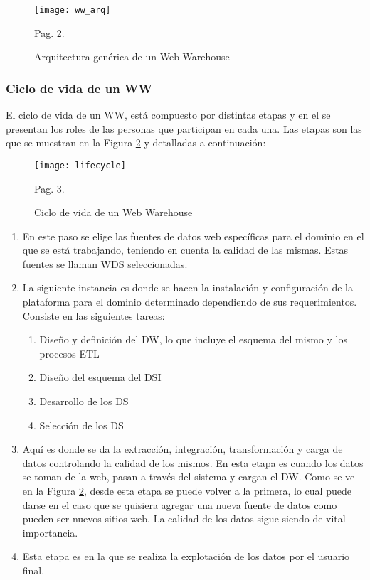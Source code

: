 \documentclass[a4paper,11pt]{article}
\begin{document}
\begin{flushleft}
    \begin{figure}[!htb]
      \begin{center}
        \texttt{[image: ww\_arq]}
        \caption{Arquitectura genérica de un Web Warehouse} \cite{webwarehouse} Pag. 2.
        \label{ww_arq}
      \end{center}
    \end{figure}
    
    
    \subsubsection{Ciclo de vida de un WW}
    
    El ciclo de vida de un WW, está compuesto por distintas etapas y en el se presentan los roles de las personas que participan en cada una. Las
    etapas son las que se muestran en la Figura \ref{lifecycle} y detalladas a continuación:
    
    \begin{figure}[!htb]
      \begin{center}
        \texttt{[image: lifecycle]}
        \caption{Ciclo de vida de un Web Warehouse} \cite{webwarehouse} Pag. 3.
        \label{lifecycle}
      \end{center}
    \end{figure}
    
    \begin{enumerate}
      \item En este paso se elige las fuentes de datos web específicas para el dominio en el que se está trabajando, teniendo en cuenta la calidad de las mismas.
      Estas fuentes se llaman WDS seleccionadas.
      \item La siguiente instancia es donde se hacen la instalación y configuración de la plataforma para el dominio determinado dependiendo de sus
      requerimientos. Consiste en las siguientes tareas:
        \begin{enumerate}
          \item Diseño y definición del DW, lo que incluye el esquema del mismo y los procesos ETL
          \item Diseño del esquema del DSI
          \item Desarrollo de los DS
          \item Selección de los DS
        \end{enumerate}
      \item Aquí es donde se da la extracción, integración, transformación y carga de datos controlando la calidad de los mismos. En esta etapa es cuando los
      datos se toman de la web, pasan a través del sistema y cargan el DW. Como se ve en la Figura \ref{lifecycle}, desde esta etapa se puede volver a la
      primera, lo cual puede darse en el caso que se quisiera agregar una nueva fuente de datos como pueden ser nuevos sitios web. La calidad de los datos sigue
      siendo de vital importancia.
      \item Esta etapa es en la que se realiza la explotación de los datos por el usuario final.
    \end{enumerate}
    

\end{flushleft}
\end{document}
